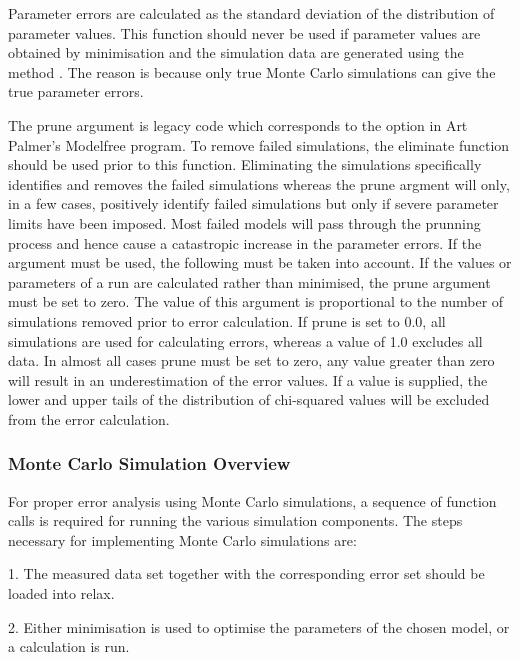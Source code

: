 Parameter errors are calculated as the standard deviation of the distribution of parameter
values.  This function should never be used if parameter values are obtained by minimisation 
and the simulation data are generated using the method 
.  The reason is because only
true Monte Carlo simulations can give the true parameter errors.

The prune argument is legacy code which corresponds to the 
 option in Art Palmer's
Modelfree program.  To remove failed simulations, the eliminate function should be used
prior to this function.  Eliminating the simulations specifically identifies and removes the
failed simulations whereas the prune argment will only, in a few cases, positively identify
failed simulations but only if severe parameter limits  have been imposed.  Most failed
models will pass through the prunning process and hence cause a catastropic increase in the
parameter errors.  If the argument must be used, the following must be taken into account.
If the values or parameters of a run are calculated rather than minimised,  the prune
argument must be set to zero.  The value of this argument is proportional to the number of
simulations removed prior to error calculation.  If prune is set to 0.0, all simulations are
used for calculating errors, whereas a value of 1.0 excludes all data.  In almost all cases
prune must be set to zero, any value greater than zero will result in an underestimation of
the error values.  If a value is supplied, the lower and upper tails of the distribution of
chi-squared  values will be excluded from the error calculation.



\subsubsection{Monte Carlo Simulation Overview}

For proper error analysis using Monte Carlo simulations, a sequence  of function calls is
required for running the various simulation components.  The steps necessary for
implementing Monte Carlo simulations are:

1.  The measured data set together with the corresponding error set should be loaded into
relax.

2.  Either minimisation  is used to optimise  the parameters of the chosen model, or a
calculation is run.

